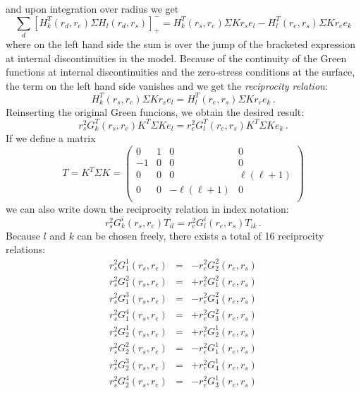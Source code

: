 \documentclass[11pt,a4paper]{article}
\begin{document}
and upon integration over radius we get
\begin{equation}
\sum_d \left[H_k^T(r_d,r_e)\Sigma H_l(r_d,r_s)\right]^-_+ = H_k^T(r_s,r_e)\Sigma Kr_se_l-H_l^T(r_e,r_s)\Sigma Kr_ee_k
\end{equation}
where on the left hand side the sum is over the jump of the bracketed expression at internal discontinuities in the model. Because of the continuity of the Green functions at internal discontinuities and the zero-stress conditions at the surface, the term on the left hand side vanishes and we get the \emph{reciprocity relation}:
\begin{equation}
H_k^T(r_s,r_e)\Sigma Kr_se_l=H_l^T(r_e,r_s)\Sigma Kr_ee_k \,.
\end{equation}
%
Reinserting the original Green funcions, we obtain the desired result:
\begin{equation}
r_s^2G_k^T(r_s,r_e)K^T\Sigma Ke_l=r_e^2 G_l^T(r_e,r_s)K^T\Sigma Ke_k \,.
\end{equation}
%
If we define a matrix 
\begin{equation}
T=K^T\Sigma K=\left(\begin{array}{cccc}
0 & 1 & 0 & 0 \\
-1 & 0 & 0 & 0 \\
0 & 0 & 0 & \ell(\ell+1) \\
0 & 0 & -\ell(\ell+1) & 0 \\
\end{array}\right)
\end{equation}
%
we can also write down the reciprocity relation in index notation:
\begin{equation}
r_s^2 G_k^i(r_s,r_e) T_{il} = r_e^2 G_l^i(r_e,r_s) T_{ik} \,.
\end{equation}
Because $l$ and $k$ can be chosen freely, there exists a total of 16 reciprocity relations:
\begin{eqnarray}
r_s^2 G_1^1(r_s,r_e) & = & -r_e^2 G_2^2(r_e,r_s) \nonumber \\
r_s^2 G_1^2(r_s,r_e) & = & +r_e^2 G_1^2(r_e,r_s) \nonumber \\
r_s^2 G_1^3(r_s,r_e) & = & -r_e^2 G_4^2(r_e,r_s) \nonumber \\
r_s^2 G_1^4(r_s,r_e) & = & +r_e^2 G_3^2(r_e,r_s)
\end{eqnarray}
\begin{eqnarray}
r_s^2 G_2^1(r_s,r_e) & = & +r_e^2 G_2^1(r_e,r_s) \nonumber \\
r_s^2 G_2^2(r_s,r_e) & = & -r_e^2 G_1^1(r_e,r_s) \nonumber \\
r_s^2 G_2^3(r_s,r_e) & = & +r_e^2 G_4^1(r_e,r_s) \nonumber \\
r_s^2 G_2^4(r_s,r_e) & = & -r_e^2 G_3^1(r_e,r_s)
\end{eqnarray}
\end{document}
